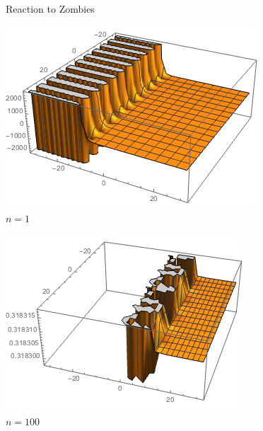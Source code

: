 \documentclass{beamer}
\begin{document}
\begin{frame}{Reaction to Zombies}
\begin{center}

\begin{minipage}{0.4\textwidth}
\includegraphics[scale=0.3]{heat_01}\\
$n=1$
\end{minipage}
\begin{minipage}{0.4\textwidth}
\pause\includegraphics[scale=0.3]{heat_02}\\
$n=100$
\end{minipage}


\end{center}
\end{frame}
\end{document}
